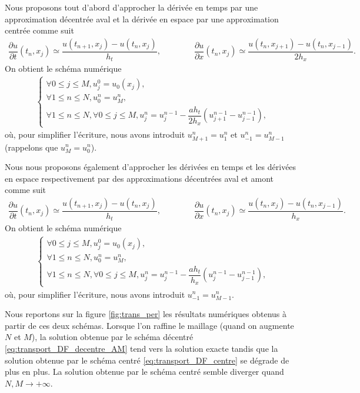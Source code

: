 \documentclass[12pt,a4paper,twoside]{article}
\begin{document}
Nous proposons tout d'abord d'approcher la d\'eriv\'ee en temps par une
approximation d\'ecentr\'ee aval et la d\'eriv\'ee en espace par une 
approximation centr\'ee comme suit
\begin{align*}
  \dfrac{\partial u}{\partial t}(t_n,x_j) \simeq \dfrac{u(t_{n+1},x_j) - u(t_n,x_j)}{h_t} ,
  \qquad \qquad 
  \dfrac{\partial u}{\partial x}(t_n,x_j) \simeq \dfrac{u(t_n,x_{j+1}) - u(t_n,x_{j-1})}{2 h_x} .
\end{align*}
On obtient le sch\'ema num\'erique
\begin{align}
  \label{eq:transport_DF_centre}
  \left\{
  \begin{array}{l}
    \forall 0 \leq j \leq M , 
    u_j^0 = u_0(x_j) ,
    \\
    \forall 1 \leq n \leq N, u_0^n = u_M^n ,
    \\
    \forall 1 \leq n \leq N, \forall 0 \leq j \leq M,
    u_j^n = u_j^{n-1} - \dfrac{a h_t}{2 h_x} (u_{j+1}^{n-1} - u_{j-1}^{n-1}) ,
  \end{array}
  \right.
\end{align}
o\`u, pour simplifier l'\'ecriture, 
nous avons introduit $u_{M+1}^n = u_1^n$ et $u_{-1}^n = u_{M-1}^n$
(rappelons que $u_M^n = u_0^n$).


Nous nous proposons \'egalement d'approcher les d\'eriv\'ees en temps et les d\'eriv\'ees
en espace respectivement par des approximations d\'ecentr\'ees aval et amont comme suit
\begin{align}
  \label{eq:der_decentre_AM}
  \dfrac{\partial u}{\partial t}(t_n,x_j) \simeq \dfrac{u(t_{n+1},x_j) - u(t_n,x_j)}{h_t} ,
  \qquad \qquad 
  \dfrac{\partial u}{\partial x}(t_n,x_j) \simeq \dfrac{u(t_n,x_{j}) - u(t_n,x_{j-1})}{h_x} .
\end{align}
On obtient le sch\'ema num\'erique
\begin{align}
  \label{eq:transport_DF_decentre_AM}
  \left\{
  \begin{array}{l}
    \forall 0 \leq j \leq M , 
    u_j^0 = u_0(x_j) ,
    \\
    \forall 1 \leq n \leq N, u_0^n = u_M^n ,
    \\
    \forall 1 \leq n \leq N, \forall 0 \leq j \leq M,
    u_j^n = u_j^{n-1} - \dfrac{a h_t}{h_x} (u_{j}^{n-1} - u_{j-1}^{n-1}) ,
  \end{array}
  \right.
\end{align}
o\`u, pour simplifier l'\'ecriture, nous avons introduit $u_{-1}^n = u_{M-1}^n$.


Nous reportons sur la figure \ref{fig:trans_per} 
les r\'esultats num\'eriques obtenus \`a partir de ces deux sch\'emas.
Lorsque l'on raffine le maillage (quand on augmente $N$ et $M$),
la solution obtenue par le sch\'ema d\'ecentr\'e \eqref{eq:transport_DF_decentre_AM}
tend vers la solution exacte
tandis que la solution obtenue par le sch\'ema centr\'e \eqref{eq:transport_DF_centre}
se d\'egrade de plus en plus. La solution obtenue par le sch\'ema centr\'e semble
diverger quand $N, M \to +\infty$.
\end{document}
